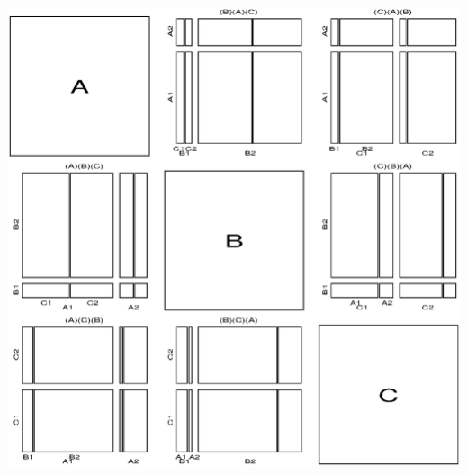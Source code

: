 \begin{center}
\begin{minipage}[c]{.33\linewidth}
 \end{minipage}
 \hfill
 \begin{minipage}[c]{.33\linewidth}
  \includegraphics[width=1\linewidth]{ch4/fig/mosfit-1}
 \end{minipage}
\end{center}

